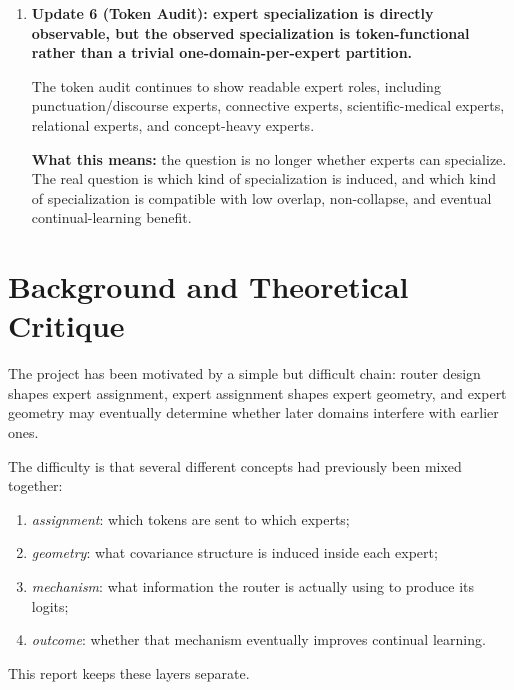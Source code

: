 \documentclass[11pt]{article}
\begin{document}
\begin{enumerate}
    \textbf{What this means:} the project is no longer trying to defend the old diagonal form as the final answer. The live quadratic hypothesis is a hybrid route with explicit mean-aware, centered-linear, and subspace-energy components, together with intra-expert orthogonality and inter-expert separation. This is a revised mechanism under training, not a completed empirical result.

    \item \textbf{Update 6 (Token Audit): expert specialization is directly observable, but the observed specialization is token-functional rather than a trivial one-domain-per-expert partition.}

    The token audit continues to show readable expert roles, including punctuation/discourse experts, connective experts, scientific-medical experts, relational experts, and concept-heavy experts.

    \textbf{What this means:} the question is no longer whether experts can specialize. The real question is which kind of specialization is induced, and which kind of specialization is compatible with low overlap, non-collapse, and eventual continual-learning benefit.
\end{enumerate}

\section{Background and Theoretical Critique}

The project has been motivated by a simple but difficult chain: router design shapes expert assignment, expert assignment shapes expert geometry, and expert geometry may eventually determine whether later domains interfere with earlier ones.

The difficulty is that several different concepts had previously been mixed together:
\begin{enumerate}
    \item \emph{assignment}: which tokens are sent to which experts;
    \item \emph{geometry}: what covariance structure is induced inside each expert;
    \item \emph{mechanism}: what information the router is actually using to produce its logits;
    \item \emph{outcome}: whether that mechanism eventually improves continual learning.
\end{enumerate}

This report keeps these layers separate.
\end{document}
